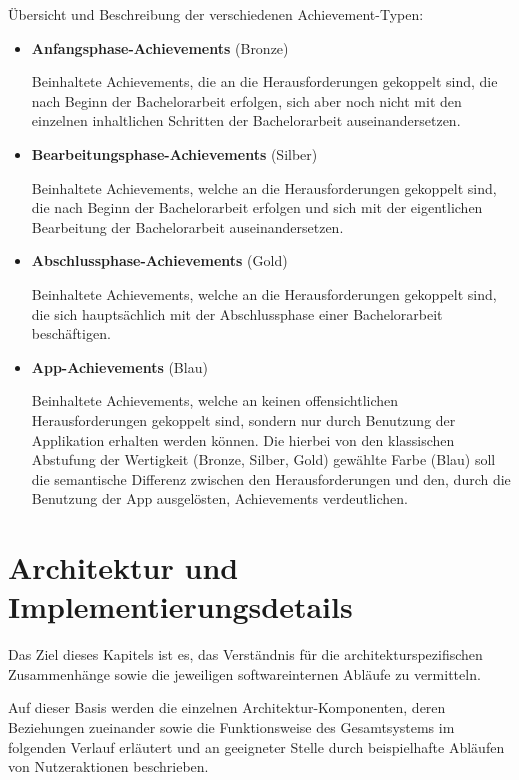\documentclass[bibliography=totoc,listof=totoc,BCOR=5mm,DIV=12,oneside]{scrbook}
\begin{document}
\par \bigskip Übersicht und Beschreibung der verschiedenen Achievement-Typen:
\begin{itemize}
\item \textbf{Anfangsphase-Achievements} (Bronze)
\par Beinhaltete Achievements, die an die Herausforderungen gekoppelt sind, die nach Beginn der Bachelorarbeit erfolgen, sich aber noch nicht mit den einzelnen inhaltlichen Schritten der Bachelorarbeit auseinandersetzen.
\item \textbf{Bearbeitungsphase-Achievements} (Silber)
\par Beinhaltete Achievements, welche an die Herausforderungen gekoppelt sind, die nach Beginn der Bachelorarbeit erfolgen und sich mit der eigentlichen Bearbeitung der Bachelorarbeit auseinandersetzen.
\item \textbf{Abschlussphase-Achievements} (Gold)
\par Beinhaltete Achievements, welche an die Herausforderungen gekoppelt sind, die sich hauptsächlich mit der Abschlussphase einer Bachelorarbeit beschäftigen.
\item \textbf{App-Achievements} (Blau)
\par Beinhaltete Achievements, welche an keinen offensichtlichen Herausforderungen gekoppelt sind, sondern nur durch Benutzung der Applikation erhalten werden können. Die hierbei von den klassischen Abstufung der Wertigkeit (Bronze, Silber, Gold) gewählte Farbe (Blau) soll die semantische Differenz zwischen den Herausforderungen und den, durch die Benutzung der App ausgelösten, Achievements verdeutlichen. 
\end{itemize} 

\newpage
\chapter{Architektur und Implementierungsdetails} \label{chap:architektur}
\par Das Ziel dieses Kapitels ist es, das Verständnis für die architekturspezifischen Zusammenhänge sowie die jeweiligen softwareinternen Abläufe zu vermitteln. 
\par Auf dieser Basis werden die einzelnen Architektur-Komponenten, deren Beziehungen zueinander sowie die Funktionsweise des Gesamtsystems im folgenden Verlauf erläutert und an geeigneter Stelle durch beispielhafte Abläufen von Nutzeraktionen beschrieben.
\end{document}
